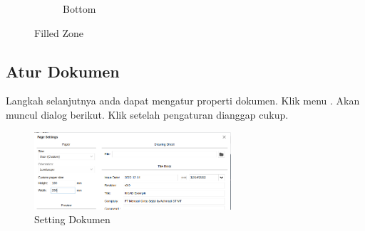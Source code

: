 \documentclass[12pt]{book}
\begin{document}
\begin{itemize}
\begin{figure}[!ht]
\begin{subfigure}[t]{0.45\textwidth}
				\caption{Bottom}
			\end{subfigure}
			\caption{Filled Zone}
		\end{figure}
	\end{itemize}

	\newpage
	\subsection{Atur Dokumen}
	Langkah selanjutnya anda dapat mengatur properti dokumen.
	Klik menu .
	Akan muncul dialog berikut.
	Klik  setelah pengaturan dianggap cukup.

	\begin{figure}[!ht]
		\centering
		\includegraphics[width=0.65\textwidth]{images/pcb/pcb_27}
		\caption{Setting Dokumen}
	\end{figure}
\end{document}
